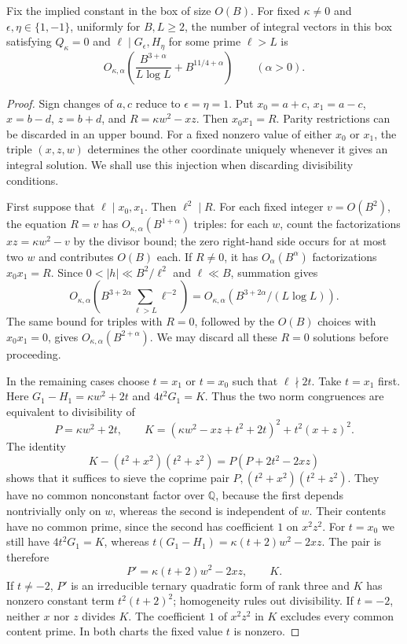 \begin{lemma}\label{lem:v5-large-sieve}
Fix the implied constant in the box of size $O(B)$.
For fixed $\kappa\ne0$ and $\epsilon,\eta\in\{1,-1\}$, uniformly for
$B,L\geq2$, the number of integral vectors in this box satisfying
$Q_\kappa=0$ and
$\ell\mid G_\epsilon,H_\eta$ for some prime $\ell>L$ is
\begin{equation}\label{eq:v5-large-sieve}
 O_{\kappa,\alpha}\left(
    \frac{B^{3+\alpha}}{L\log L}+B^{11/4+\alpha}\right)
 \qquad(\alpha>0).
\end{equation}
\end{lemma}
\begin{proof}
Sign changes of $a,c$ reduce to $\epsilon=\eta=1$.
Put $x_0=a+c$, $x_1=a-c$, $x=b-d$, $z=b+d$, and
$R=\kappa w^2-xz$. Then $x_0x_1=R$.
Parity restrictions can be discarded in an upper bound.
For a fixed nonzero value of either $x_0$ or $x_1$, the triple $(x,z,w)$
determines the other coordinate uniquely whenever it gives an integral
solution. We shall use this injection when discarding divisibility
conditions.

First suppose that $\ell\mid x_0,x_1$. Then $\ell^2\mid R$.
For each fixed integer $v=O(B^2)$, the equation $R=v$ has
$O_{\kappa,\alpha}(B^{1+\alpha})$ triples: for each $w$, count the
factorizations $xz=\kappa w^2-v$ by the divisor bound; the zero right-hand
side occurs for at most two $w$ and contributes $O(B)$ each.
If $R\ne0$, it has $O_\alpha(B^\alpha)$ factorizations $x_0x_1=R$.
Since $0<|h|\ll B^2/\ell^2$ and $\ell\ll B$, summation gives
\[
 O_{\kappa,\alpha}\left(
 B^{3+2\alpha}\sum_{\ell>L}\ell^{-2}\right)
 =O_{\kappa,\alpha}(B^{3+2\alpha}/(L\log L)).
\]
The same bound for triples with $R=0$, followed by the $O(B)$ choices
with $x_0x_1=0$, gives $O_{\kappa,\alpha}(B^{2+\alpha})$.
We may discard all these $R=0$ solutions before proceeding.

In the remaining cases choose $t=x_1$ or $t=x_0$ such that $\ell\nmid2t$.
Take $t=x_1$ first. Here
$G_1-H_1=\kappa w^2+2t$ and $4t^2G_1=K$.
Thus the two norm congruences are equivalent to divisibility of
\[
 P=\kappa w^2+2t,\qquad
 K=(\kappa w^2-xz+t^2+2t)^2+t^2(x+z)^2.
\]
The identity
\[
 K-(t^2+x^2)(t^2+z^2)=P(P+2t^2-2xz)
\]
shows that it suffices to sieve the coprime pair
$P,(t^2+x^2)(t^2+z^2)$. They have no common nonconstant factor over
$\mathbb Q$, because the first depends nontrivially only on $w$, whereas
the second is independent of $w$. Their contents have no common prime,
since the second has coefficient $1$ on $x^2z^2$.
For $t=x_0$ we still have $4t^2G_1=K$, whereas
$t(G_1-H_1)=\kappa(t+2)w^2-2xz$. The pair is therefore
\[
 P'=\kappa(t+2)w^2-2xz,\qquad K.
\]
If $t\ne-2$, $P'$ is an irreducible ternary quadratic form of rank three
and $K$ has nonzero constant term $t^2(t+2)^2$; homogeneity rules out
divisibility. If $t=-2$, neither $x$ nor $z$ divides $K$.
The coefficient $1$ of $x^2z^2$ in $K$ excludes every common content
prime. In both charts the fixed value $t$ is nonzero.


\end{proof}
